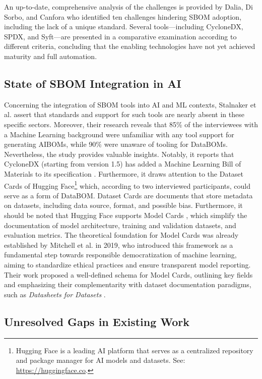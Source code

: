 An up-to-date, comprehensive analysis of the challenges is provided by Dalia, Di Sorbo, and Canfora \cite{dalia2024sbom} who identified ten challenges hindering SBOM adoption, including the lack of a unique standard. Several tools—including CycloneDX, SPDX, and Syft—are presented in a comparative examination according to different criteria, concluding that the enabling technologies have not yet achieved maturity and full automation.


\subsection{State of SBOM Integration in AI}
Concerning the integration of SBOM tools into AI and ML contexts, Stalnaker et al. \cite{stalnaker2024boms} assert that standards and support for such tools are nearly absent in these specific sectors. Moreover, their research reveals that 85\% of the interviewees with a Machine Learning background were unfamiliar with any tool support for generating AIBOMs, while 90\% were unaware of tooling for DataBOMs. Nevertheless, the study provides valuable insights. Notably, it reports that CycloneDX (starting from version 1.5) has added a Machine Learning Bill of Materials to its specification \cite{cyclonedxMLBOM}. Furthermore, it draws attention to the Dataset Cards \cite{huggingfaceDatasetCards} of Hugging Face\footnote
{Hugging Face is a leading AI platform that serves as a centralized repository and package manager for AI models and datasets.
See: \href{https://huggingface.co}{https://huggingface.co}.} which, according to two interviewed participants, could serve as a form of DataBOM. Dataset Cards are documents that store metadata on datasets, including data source, format, and possible bias. Furthermore, it should be noted that Hugging Face supports Model Cards \cite{huggingfaceModelCards}, which simplify the documentation of model architecture, training and validation datasets, and evaluation metrics. The theoretical foundation for Model Cards was already established by Mitchell et al. \cite{mitchell2019model} in 2019, who introduced this framework as a fundamental step towards responsible democratization of machine learning, aiming to standardize ethical practices and ensure transparent model reporting. Their work proposed a well-defined schema for Model Cards, outlining key fields and emphasizing their complementarity with dataset documentation paradigms, such as \textit{Datasheets for Datasets} \cite{Gebru2021Datasheets}.


\subsection{Unresolved Gaps in Existing Work}\label{sec:gaps}

